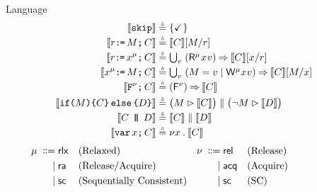   Language
  \begin{gather*}
    \begin{aligned}
      \sem[\aThrd]{\SKIP} & \eqdef
      \{ \DSTOP \}
      \\
      \sem[\aThrd]{\aReg\GETS\aExp\SEMI \aCmd} & \eqdef
      \sem[\aThrd]{\aCmd}[\aExp/\aReg]
      \\ 
      \sem{\aReg\GETS\aLoc^{\amode}\SEMI \aCmd} & \eqdef \textstyle\bigcup_\aVal\;
      (\DR[\amode]\aLoc\aVal)\prefix \sem{\aCmd} [\aLoc/\aReg]
      \\
      \sem{\aLoc^{\amode}\GETS\aExp\SEMI \aCmd} & \eqdef
      \textstyle\bigcup_\aVal\; (\aExp=\aVal \mid \DW[\amode]\aLoc\aVal)\prefix \sem{\aCmd}[\aExp/\aLoc]
      \\
      \sem{\FENCE^{\fmode}\SEMI \aCmd} & \eqdef
      (\DFS{\fmode}) \prefix \sem{\aCmd}
      \\
      \sem[\aThrd]{\IF{\aExp} \THEN \aCmd \ELSE \bCmd \FI} & \eqdef
      \bigl(\aExp \guard \sem[\aThrd]{\aCmd}\bigr) \parallel \bigl(\lnot\aExp \guard \sem[\aThrd]{\bCmd}\bigr) 
      \\
      \sem[\aThrd]{\aCmd \PAR[\bThrd][\bThrd'] \bCmd} & \eqdef
      \sem[\bThrd]{\aCmd} \parallel \sem[\bThrd']{\bCmd} 
      \\
      \sem[\aThrd]{\VAR\aLoc\SEMI \aCmd} & \eqdef
      \nu \aLoc \DOT \sem[\aThrd]{\aCmd}  
    \end{aligned}
  \end{gather*}
  \begin{align*}
    \mu \;\mathrel{\mathord{\vcentcolon}\mkern-1mu\mathord{\vcentcolon}\mathord{{=}}}\;& {\mathsf{rlx}} &&\text{{(Relaxed)}} &\nu \;\mathrel{\mathord{\vcentcolon}\mkern-1mu\mathord{\vcentcolon}\mathord{{=}}}\;&{\mathsf{rel}}  &&\text{(Release)} &\hbox{$\;\mkern60mu\;$}&
    \\ \;\mathrel{|}\;& {\mathsf{ra}} &&\text{{(Release/Acquire)}}            & \;\mathrel{|}\;&{\mathsf{acq}}   &&\text{(Acquire)} 
    \\ \;\mathrel{|}\;& {\mathsf{sc}} &&\text{{(Sequentially Consistent)}}    &      \;\mathrel{|}\;&{\mathsf{sc}}  &&\text{(SC)} 
  \end{align*}
  